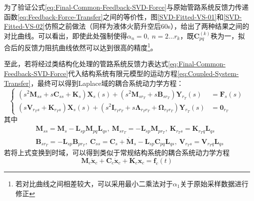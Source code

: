 为了验证公式\eqref{eq:Final-Common-Feedback-SVD-Force}与原始管路系统反馈力传递函数\eqref{eq:Feedback-Force-Transfer}之间的等价性，图\ref{SVD-Fitted-VS-01}和\ref{SVD-Fitted-VS-02}仿照之前做法（同样为液体火箭升空后60s），给出了两种结果之间的对比曲线。可以看出，即使此处强制使得$\alpha_n=0,\ n=2\dots r_k$，既$\boldsymbol{C}_{pq}^{(k)}$秩为一，拟合后的反馈力阻抗曲线依然可以达到很高的精度\footnote{若对比曲线之间相差较大，可以采用最小二乘法对于$\alpha_1$关于原始采样数据进行修正}。

至此，若将经过类结构化处理的管路系统反馈力表达式\eqref{eq:Final-Common-Feedback-SVD-Force}代入结构系统有限元模型的运动方程\eqref{eq:Coupled-System-Transfer}，最终可以得到Laplace域的耦合系统动力学方程：
\begin{equation}
  \label{eq:Final-Coupled-System-Laplace}
  \left\{
  \begin{aligned}
    (s^2\boldsymbol{M}_{ss}+ s\boldsymbol{C}_{ss}+ \boldsymbol{K}_{s}) \boldsymbol{X}_{s}(s)+(s^2\boldsymbol{M}_{sr_T}+s\boldsymbol{B}_{sr_T}) \boldsymbol{Y}_{r_T}(s)                    & =\boldsymbol{F}_{s}(s) \\
    (s\boldsymbol{V}_{r_Ts}+\boldsymbol{K}_{r_Ts})\boldsymbol{X}_{s}(s)+(s^2\boldsymbol{I}_{r_Tr_T}+s\boldsymbol{\Lambda}_{r_Tr_T}+\boldsymbol{\Omega}_{r_Tr_T})\boldsymbol{Y}_{r_{T}}(s) & =\boldsymbol{0}_{r_T}
  \end{aligned} \right.
\end{equation}
其中
\begin{displaymath}
  \begin{aligned}
     & \boldsymbol{M}_{ss}=\boldsymbol{M}_{s}-\boldsymbol{L}_{sp}\boldsymbol{M}_{pq}\boldsymbol{L}_{qs},\
    \boldsymbol{M}_{sr_T}=-\boldsymbol{L}_{sp}\boldsymbol{M}_{pr_T},\
    \boldsymbol{K}_{r_Ts}=\boldsymbol{K}_{r_Tq}\boldsymbol{L}_{qs}                                        \\
     & \boldsymbol{B}_{sr_{T}}=-\boldsymbol{L}_{sp}\boldsymbol{B}_{pr_T},\
    \boldsymbol{C}_{ss}=\boldsymbol{C}_{s}+\dot{\boldsymbol{M}}_s -\boldsymbol{L}_{sp}\boldsymbol{C}_{pq}\boldsymbol{L}_{qs},\
    \boldsymbol{V}_{r_Ts}=\boldsymbol{V}_{r_Tq}\boldsymbol{L}_{qs}
  \end{aligned}
\end{displaymath}
若将上式变换到时域，可以得到类似于常规结构系统的耦合系统动力学方程
\begin{equation}
  \label{eq:Final-Coupled-1D-Transfer}
  \boldsymbol{M}_c\ddot{\boldsymbol{x}}_c+\boldsymbol{C}_c\dot{\boldsymbol{x}}_c+\boldsymbol{K}_c\boldsymbol{x}_c=\boldsymbol{f}_c(t)
\end{equation}
